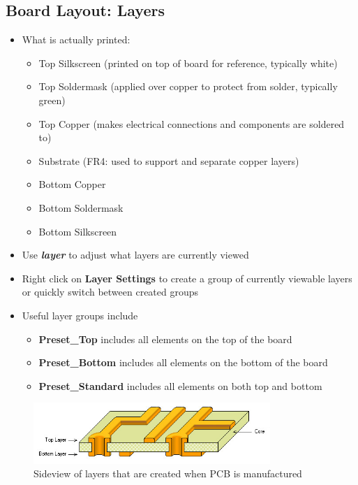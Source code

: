\documentclass{article}
\begin{document}
\subsection{Board Layout: Layers}
\begin{itemize}
    \item What is actually printed:
    \begin{itemize}
        \item Top Silkscreen (printed on top of board for reference, typically white)
        \item Top Soldermask (applied over copper to protect from solder, typically green)
        \item Top Copper (makes electrical connections and components are soldered to)
        \item Substrate (FR4: used to support and separate copper layers)
        \item Bottom Copper
        \item Bottom Soldermask
        \item Bottom Silkscreen
    \end{itemize}
    \item Use \textit{\textbf{layer}} to adjust what layers are currently viewed
\end{itemize}
\begin{tcolorbox} [title=Tips \& Tricks]
    \begin{itemize}
        \item Right click on \textbf{Layer Settings} to create a group of currently viewable layers or quickly switch between created groups
        \item Useful layer groups include
        \begin{itemize}
        \item \textbf{Preset\_Top} includes all elements on the top of the board
        \item \textbf{Preset\_Bottom} includes all elements on the bottom of the board
        \item \textbf{Preset\_Standard} includes all elements on both top and bottom
        \end{itemize}
    \end{itemize}
\end{tcolorbox}

\begin{figure}[!h]
    \center
    \includegraphics[width=0.8\textwidth,height=0.4\textheight,keepaspectratio]{layers1}
    \caption {Sideview of layers that are created when PCB is manufactured}
    \label{img:layers}
\end{figure}
\end{document}
